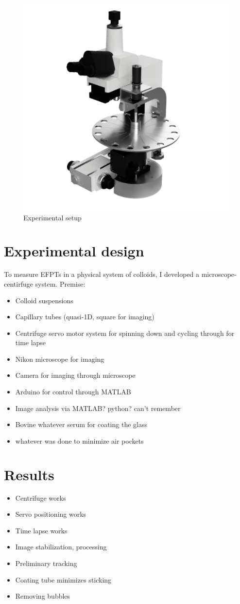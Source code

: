 \begin{figure}[htp]
\includegraphics[width=0.8\columnwidth]{Figures/microscope_centrifuge_1.png}
\caption{\label{fig:CADrender} Experimental setup}
\end{figure}

\section{Experimental design}
To measure EFPTs in a physical system of colloids, I developed a microscope-centirfuge system. Premise:
\begin{itemize}
    \item Colloid suspensions
    \item Capillary tubes (quasi-1D, square for imaging)
    \item Centrifuge servo motor system for spinning down and cycling through for time lapse
    \item Nikon microscope for imaging
    \item Camera for imaging through microscope
    \item Arduino for control through MATLAB
    \item Image analysis via MATLAB? python? can't remember
    \item Bovine whatever serum for coating the glass
    \item whatever was done to minimize air pockets
\end{itemize}
 
\section{Results}
\begin{itemize}
    \item Centrifuge works
    \item Servo positioning works
    \item Time lapse works
    \item Image stabilization, processing
    \item Preliminary tracking
    \item Coating tube minimizes sticking
    \item Removing bubbles
\end{itemize}

